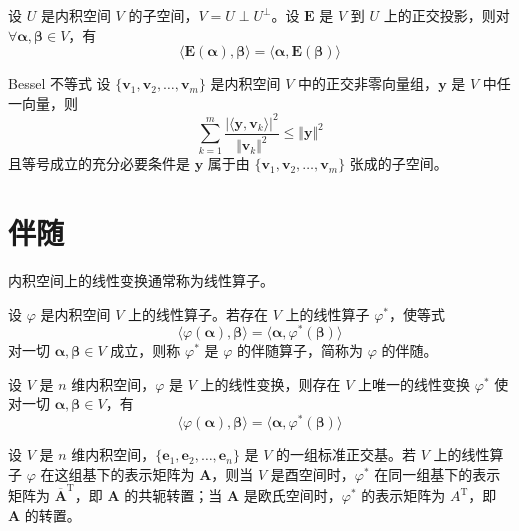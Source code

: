 \begin{proposition}
    设 $U$ 是内积空间 $V$ 的子空间，$V = U \perp U^{\perp}$。设 $\bm{E}$ 是 $V$ 到 $U$ 上的正交投影，则对 $\forall \bm{\alpha}, \bm{\beta} \in V$，有
    \[
        \langle \bm{E}(\bm{\alpha}), \bm{\beta} \rangle = \langle \bm{\alpha}, \bm{E}({\bm{\beta}}) \rangle
    \]
\end{proposition}

\begin{proposition}{Bessel 不等式}
    设 $\{\bm{v}_1, \bm{v}_2, \ldots,\bm{v}_m\}$ 是内积空间 $V$ 中的正交非零向量组，$\bm{y}$ 是 $V$ 中任一向量，则
    \[
        \sum_{k = 1}^{m}\frac{{\vert \langle \bm{y}, \bm{v}_k \rangle \vert}^2}{{\Vert \bm{v}_k \Vert}^2} \leqslant {\Vert \bm{y} \Vert}^2
    \]
    且等号成立的充分必要条件是 $\bm{y}$ 属于由 $\{\bm{v}_1, \bm{v}_2, \ldots,\bm{v}_m\}$ 张成的子空间。
\end{proposition}


\section{伴随}

内积空间上的线性变换通常称为线性算子。

\begin{definition}
    设 $\varphi$ 是内积空间 $V$ 上的线性算子。若存在 $V$ 上的线性算子 $\varphi^*$，使等式
    \[
        \langle \varphi(\bm{\alpha}), \bm{\beta} \rangle = \langle \bm{\alpha}, \varphi^{*}(\bm{\beta}) \rangle
    \]
    对一切 $\bm{\alpha}, \bm{\beta} \in V$ 成立，则称 $\varphi^*$ 是 $\varphi$ 的伴随算子，简称为 $\varphi$ 的伴随。
\end{definition}

\begin{theorem}
    设 $V$ 是 $n$ 维内积空间，$\varphi$ 是 $V$ 上的线性变换，则存在 $V$ 上唯一的线性变换 $\varphi^*$ 使对一切 $\bm{\alpha}, \bm{\beta} \in V$，有
    \[
        \langle \varphi(\bm{\alpha}), \bm{\beta} \rangle = \langle \bm{\alpha}, \varphi^{*}(\bm{\beta}) \rangle
    \]
\end{theorem}

\begin{theorem}
    设 $V$ 是 $n$ 维内积空间，$\{\bm{e}_{1}, \bm{e}_{2}, \ldots, \bm{e}_{n}\}$ 是 $V$ 的一组标准正交基。若 $V$ 上的线性算子 $\varphi$ 在这组基下的表示矩阵为 $\bm{A}$，则当 $V$ 是酉空间时，$\varphi^*$ 在同一组基下的表示矩阵为 $\overline{\bm{A}}^{\mathrm{T}}$，即 $\bm{A}$ 的共轭转置；当 $\bm{A}$ 是欧氏空间时，$\varphi^*$ 的表示矩阵为 $A^{\mathrm{T}}$，即 $\bm{A}$ 的转置。
\end{theorem}

